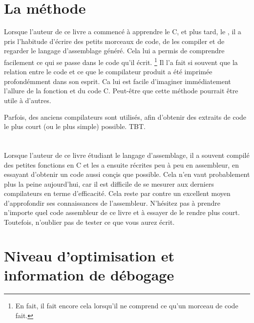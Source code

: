 \section{La méthode}

Lorsque l'auteur de ce livre a commencé à apprendre le C, et plus tard, le \Cpp, il a pris l'habitude d'écrire des petits morceaux de
code, de les compiler et de regarder le langage d'assemblage généré.
Cela lui a permis de comprendre facilement ce qui se passe dans le code qu'il écrit.
\footnote{En fait, il fait encore cela lorsqu'il ne comprend ce qu'un morceau de code fait.}
Il l'a fait si souvent que la relation entre le code \Cpp et ce que le compilateur produit a été imprimée profondémment dans son
 esprit.
Ca lui est facile d'imaginer immédiatement l'allure de la fonction et du code C.
Peut-être que cette méthode pourrait être utile à d'autres.


Parfois, des anciens compilateurs sont utilisés, afin d'obtenir des extraits de code le plus court (ou le plus simple) possible.
\ac{TBT}.
\section*{\Exercises}

Lorsque l'auteur de ce livre étudiant le langage d'assemblage, il a souvent compilé des petites fonctions en C et les a ensuite
récrites peu à peu en assembleur, en essayant d'obtenir un code aussi conçis que possible.
Cela n'en vaut probablement plus la peine aujourd'hui, car il est difficile
de se mesurer aux derniers compilateurs en terme d'efficacité. Cela reste par contre un excellent moyen d'approfondir ses connaissances
de l'assembleur.
N'hésitez pas à prendre n'importe quel code assembleur de ce livre et à essayer de le rendre plus court.
Toutefois, n'oublier pas de tester ce que vous aurez écrit.

\section*{Niveau d'optimisation et information de débogage}

